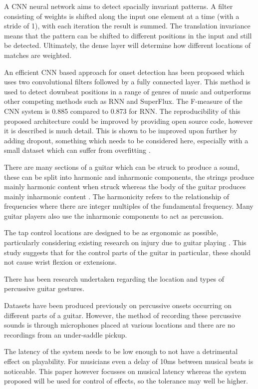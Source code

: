 \documentclass[conference]{IEEEtran}
\begin{document}
A CNN neural network aims to detect spacially invariant patterns. A filter consisting of weights is shifted along the input one element at a time (with a stride of 1), with each iteration the result is summed.
The translation invariance means that the pattern can be shifted to different positions in the input and still be detected. Ultimately, the dense layer will determine how different locations of matches
are weighted.

An efficient CNN based approach for onset detection has been proposed \cite{b1} which uses two convolutional filters followed by a fully connected layer. This method is used to detect
downbeat positions in a range of genres of music and outperforms other competing methods such as RNN and SuperFlux. The F-measure of the CNN system is 0.885 compared to 0.873 for RNN. The reproducibility of 
this proposed architecture could be improved by providing open source code, however it is described is much detail. This
is shown to be improved upon further by adding dropout, something which needs to be considered here, especially with a small dataset which can suffer from overfitting \cite{b8}.

There are many sections of a guitar which can be struck to produce a sound, these can be split into harmonic and inharmonic components, the strings produce mainly harmonic content when
struck whereas the body of the guitar produces mainly inharmonic content . The harmonicity refers to the relationship of frequencies where there are integer multiples of the fundamental frequency.
Many guitar players also use the inharmonic components to act as percussion. 

The tap control locations are designed to be as ergonomic as possible, particularly considering existing research on injury due to guitar playing . This study suggests that for the control parts 
of the guitar in particular, these should not cause wrist flexion or extensions. 

There has been research undertaken regarding the location and types of percussive guitar gestures. 

Datasets have been produced previously on percussive onsets occurring on different parts of a guitar. However, the method of recording these percussive sounds is through microphones placed at various locations and there
are no recordings from an under-saddle pickup. 

The latency of the system needs to be low enough to not have a detrimental effect on playability. For musicians even a delay of 10ms between musical beats \cite{b4} is noticeable. This paper however
focusses on musical latency whereas the system proposed will be used for control of effects, so the tolerance may well be higher.
\end{document}
